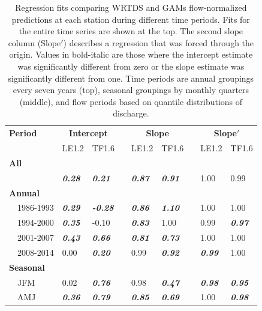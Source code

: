 \documentclass[letterpaper,12pt,oneside]{article}\usepackage[]{graphicx}\usepackage[]{color}
\begin{document}
\begin{table}[!tbp]
\caption{Regression fits comparing \ac{WRTDS} and \acp{GAM} flow-normalized predictions at each station during different time periods.  Fits for the entire time series are shown at the top.  The second slope column (Slope$'$) describes a regression that was forced through the origin.  Values in bold-italic are those where the intercept estimate was significantly different from zero or the slope estimate was significantly different from one.   Time periods are annual groupings every seven years (top), seasonal groupings by monthly quarters (middle), and flow periods based on quantile distributions of discharge.\label{tab:regnorm}} 
\begin{center}
\begin{tabular}{lllcllcll}
\hline\hline
\multicolumn{1}{l}{\bfseries Period}&\multicolumn{2}{c}{\bfseries Intercept}&\multicolumn{1}{c}{\bfseries }&\multicolumn{2}{c}{\bfseries Slope}&\multicolumn{1}{c}{\bfseries }&\multicolumn{2}{c}{\bfseries Slope$'$}\tabularnewline
\cline{2-3} \cline{5-6} \cline{8-9}
\multicolumn{1}{l}{}&\multicolumn{1}{c}{LE1.2}&\multicolumn{1}{c}{TF1.6}&\multicolumn{1}{c}{}&\multicolumn{1}{c}{LE1.2}&\multicolumn{1}{c}{TF1.6}&\multicolumn{1}{c}{}&\multicolumn{1}{c}{LE1.2}&\multicolumn{1}{c}{TF1.6}\tabularnewline
\hline
{\bfseries All}&&&&&&&&\tabularnewline
~~&{\bf \textit{0.28}}&{\bf \textit{0.21}}&&{\bf \textit{0.87}}&{\bf \textit{0.91}}&&1.00&0.99\tabularnewline
\hline
{\bfseries Annual}&&&&&&&&\tabularnewline
~~1986-1993&{\bf \textit{0.29}}&{\bf \textit{-0.28}}&&{\bf \textit{0.86}}&{\bf \textit{1.10}}&&1.00&1.00\tabularnewline
~~1994-2000&{\bf \textit{0.35}}&-0.10&&{\bf \textit{0.83}}&1.00&&0.99&{\bf \textit{0.97}}\tabularnewline
~~2001-2007&{\bf \textit{0.43}}&{\bf \textit{0.66}}&&{\bf \textit{0.81}}&{\bf \textit{0.73}}&&1.00&1.00\tabularnewline
~~2008-2014&0.00&{\bf \textit{0.20}}&&0.99&{\bf \textit{0.92}}&&{\bf \textit{0.99}}&1.00\tabularnewline
\hline
{\bfseries Seasonal}&&&&&&&&\tabularnewline
~~JFM&0.02&{\bf \textit{0.76}}&&0.98&{\bf \textit{0.47}}&&{\bf \textit{0.98}}&{\bf \textit{0.95}}\tabularnewline
~~AMJ&{\bf \textit{0.36}}&{\bf \textit{0.79}}&&{\bf \textit{0.85}}&{\bf \textit{0.69}}&&1.00&{\bf \textit{0.98}}\tabularnewline

\end{tabular}
\end{center}
\end{table}
\end{document}
